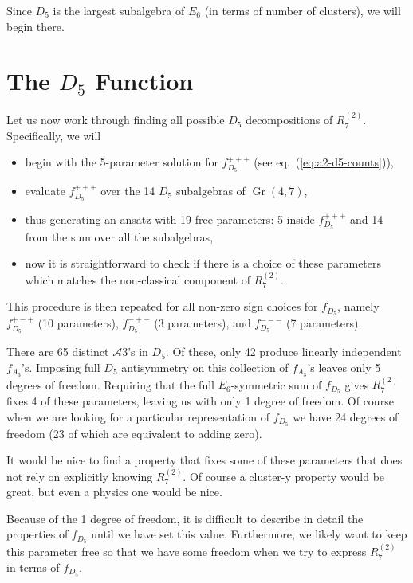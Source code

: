 \documentclass[11pt]{article}
\DeclareMathOperator{\Gr}{Gr}
\def\a{\mathcal{A}}
\def\pdfeq#1{\texorpdfstring{$#1$}{a}}
\def\fd5{f_{D_5}}
\def\fa3{f_{A_3}}
\begin{document}
Since $D_5$ is the largest subalgebra of $E_6$ (in terms of number of clusters), we will begin there. 

\section{The \pdfeq{D_5} Function}\label{sec:d5-func}

Let us now work through finding all possible $D_5$ decompositions of $R^{(2)}_7$. Specifically, we will
\begin{itemize}
	\item begin with the 5-parameter solution for $f_{D_5}^{+++}$ (see eq.~(\ref{eq:a2-d5-counts})),
	\item evaluate $f_{D_5}^{+++}$ over the 14 $D_5$ subalgebras of $\Gr(4,7)$,
	\item thus generating an ansatz with 19 free parameters: 5 inside $f_{D_5}^{+++}$ and 14 from the sum over all the subalgebras,
	\item now it is straightforward to check if there is a choice of these parameters which matches the non-classical component of $R^{(2)}_7$.
\end{itemize}
This procedure is then repeated for all non-zero sign choices for $f_{D_5}$, namely $f_{D_5}^{+-+}$ (10 parameters), $f_{D_5}^{-+-}$ (3 parameters), and $f_{D_5}^{---}$ (7 parameters). 




There are 65 distinct $\a3$'s in $D_5$. Of these, only 42 produce linearly independent $\fa3$'s. Imposing full $D_5$ antisymmetry on this collection of $\fa3$'s leaves only 5 degrees of freedom. Requiring that the full $E_6$-symmetric sum of $\fd5$ gives $R^{(2)}_7$ fixes 4 of these parameters, leaving us with only 1 degree of freedom. Of course when we are looking for a particular representation of $\fd5$ we have 24 degrees of freedom (23 of which are equivalent to adding zero).

It would be nice to find a property that fixes some of these parameters that does not rely on explicitly knowing $R^{(2)}_7$. Of course a cluster-y property would be great, but even a physics one would be nice. 

Because of the 1 degree of freedom, it is difficult to describe in detail the properties of $\fd5$ until we have set this value. Furthermore, we likely want to keep this parameter free so that we have some freedom when we try to express $R^{(2)}_7$ in terms of $\fd5$. 
\end{document}
